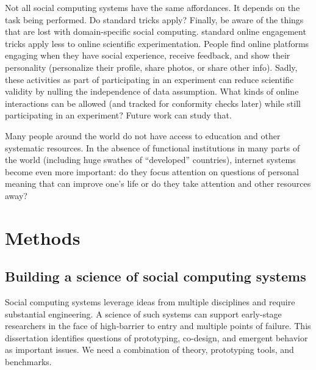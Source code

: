 Not all social computing systems have the same affordances. It depends on the task being performed. Do standard tricks apply? Finally, be aware of the things that are lost with domain-specific social computing. standard online engagement tricks apply less to online scientific experimentation. People find online platforms engaging when they have social experience, receive feedback, and show their personality (personalize their profile, share photos, or share other info). Sadly, these activities as part of participating in an experiment can reduce scientific validity by nulling the independence of data assumption. What kinds of online interactions can be allowed (and tracked for conformity checks later) while still participating in an experiment? Future work can study that.

Many people around the world do not have access to education and other systematic resources. In the absence of functional institutions in many parts of the world (including huge swathes of “developed” countries), internet systems become even more important:  do they focus attention on questions of personal meaning that can improve one’s life or do they take attention and other resources away?


\section{Methods} 


\subsection{Building a science of social computing systems}
Social computing systems leverage ideas from multiple disciplines and require substantial engineering. A science of such systems can support early-stage researchers in the face of high-barrier to entry and multiple points of failure. This dissertation identifies questions of prototyping, co-design, and emergent behavior as important issues. We need a combination of theory, prototyping tools, and benchmarks. 

